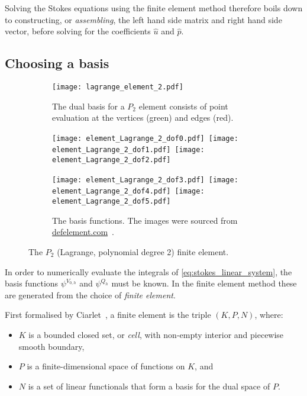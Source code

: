 \documentclass[thesis]{subfiles}
\begin{document}
Solving the Stokes equations using the finite element method therefore boils down to constructing, or \emph{assembling}, the left hand side matrix and right hand side vector, before solving for the coefficients $\hat u$ and $\hat p$.

\subsection{Choosing a basis}

\begin{figure}
  \centering
  \begin{subfigure}[b]{.4\textwidth}
    \centering
    \texttt{[image: lagrange\_element\_2.pdf]}
    \caption{
      The dual basis for a $P_2$ element consists of point evaluation at the vertices (green) and edges (red).
    }
    \label{fig:lagrange_element_2_dofs}
  \end{subfigure}
  \begin{subfigure}[b]{.58\textwidth}
    \centering
    \texttt{[image: element\_Lagrange\_2\_dof0.pdf]}\,%
    \texttt{[image: element\_Lagrange\_2\_dof1.pdf]}\,%
    \texttt{[image: element\_Lagrange\_2\_dof2.pdf]}

    \texttt{[image: element\_Lagrange\_2\_dof3.pdf]}\,%
    \texttt{[image: element\_Lagrange\_2\_dof4.pdf]}\,%
    \texttt{[image: element\_Lagrange\_2\_dof5.pdf]}
    \caption{
      The basis functions.
      The images were sourced from \href{https://defelement.com}{defelement.com}~\cite{defelement}.
    }
    \label{fig:lagrange_element_2_basis}
  \end{subfigure}

  \caption{The $P_2$ (Lagrange, polynomial degree 2) finite element.}
  \label{fig:lagrange_element_2}
\end{figure}

In order to numerically evaluate the integrals of \cref{eq:stokes_linear_system}, the basis functions $\psi^{V_{0,h}}$ and $\psi^{Q_h}$ must be known.
In the finite element method these are generated from the choice of \emph{finite element}.

First formalised by Ciarlet~\parencite{ciarletElement2002}, a finite element is the triple $(K, P, N)$, where:
\begin{itemize}
  \item $K$ is a bounded closed set, or \emph{cell}, with non-empty interior and piecewise smooth boundary,
  \item $P$ is a finite-dimensional space of functions on $K$, and
  \item $N$ is a set of linear functionals that form a basis for the dual space of $P$.
\end{itemize}
\end{document}
